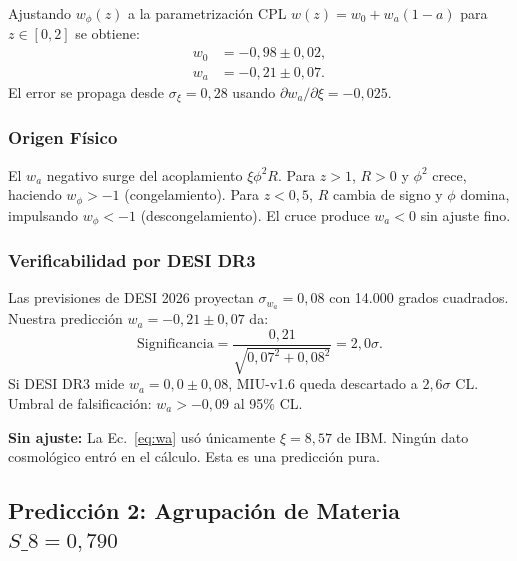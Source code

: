 \documentclass[12pt, a4paper]{article}
\theoremstyle{miuThm}
\theoremstyle{remark}
\begin{document}
Ajustando $w_{\phi}(z)$ a la parametrización CPL $w(z) = w_0 + w_a(1-a)$
para $z \in [0, 2]$ se obtiene:
\begin{align}
w_0 &= -0{,}98 \pm 0{,}02, \label{eq:w0} \\
w_a &= -0{,}21 \pm 0{,}07. \label{eq:wa}
\end{align}
El error se propaga desde $\sigma_\xi = 0{,}28$ usando $\partial w_a / \partial\xi = -0{,}025$.

\subsubsection{Origen Físico}
El $w_a$ negativo surge del acoplamiento $\xi\phi^2 R$. Para $z > 1$, $R > 0$
y $\phi^2$ crece, haciendo $w_{\phi} > -1$ (congelamiento). Para $z < 0{,}5$,
$R$ cambia de signo y $\phi$ domina, impulsando $w_{\phi} < -1$ (descongelamiento).
El cruce produce $w_a < 0$ sin ajuste fino.

\subsubsection{Verificabilidad por DESI DR3}
Las previsiones de DESI 2026 \cite{DESI2024} proyectan $\sigma_{w_a} = 0{,}08$
con 14.000 grados cuadrados. Nuestra predicción $w_a = -0{,}21 \pm 0{,}07$ da:
\begin{equation}
\text{Significancia} = \frac{0{,}21}{\sqrt{0{,}07^2 + 0{,}08^2}} = 2{,}0\sigma.
\label{eq:sigma_wa}
\end{equation}
Si DESI DR3 mide $w_a = 0{,}0 \pm 0{,}08$, MIU-v1.6 queda descartado a
$2{,}6\sigma$ CL. Umbral de falsificación: $w_a > -0{,}09$ al 95\% CL.

\textbf{Sin ajuste:} La Ec.~\eqref{eq:wa} usó únicamente $\xi = 8{,}57$ de IBM.
Ningún dato cosmológico entró en el cálculo. Esta es una predicción pura.

\subsection{Predicción 2: Agrupación de Materia $S\_8 = 0{,}790$}
\label{subsec:S8}
\end{document}
